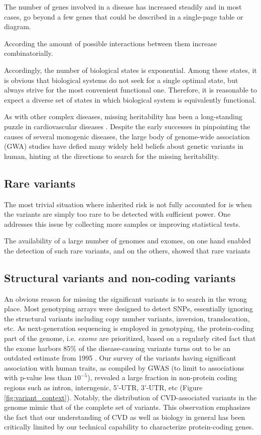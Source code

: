 \documentclass[letter]{bioinfo}
\begin{document}
The number of genes involved in a disease has increased steadily and in most cases, go beyond a few genes that could be described in a single-page table or diagram.

According the amount of possible interactions between them increase combinatorially.

Accordingly, the number of biological states is exponential. Among these states, it is obvious that biological systems do not seek for a single optimal state, but always strive for the most convenient functional one. Therefore, it is reasonable to expect a diverse set of states in which biological system is equivalently functional.

As with other complex diseases, missing heritability has been a long-standing puzzle in cardiovascular diseases \citep{Manolio:2009:Finding}. Despite the early successes in pinpointing the causes of several monogenic diseases, the large body of genome-wide association (GWA) studies have defied many widely held beliefs about genetic variants in human, hinting at the directions to search for the missing heritability.

\subsection{Rare variants}

The most trivial situation where inherited risk is not fully accounted for is when the variants are simply too rare to be detected with sufficient power. One addresses this issue by collecting more samples or improving statistical tests.

The availability of a large number of genomes and exomes, on one hand enabled the detection of such rare variants, and on the others,  showed that rare variants 

\subsection{Structural variants and non-coding variants}

An obvious reason for missing the significant variants is to search in the wrong place. Most genotyping arrays were designed to detect SNPs, essentially ignoring the structural variants including copy number variants, inversion, translocation, etc. As next-generation sequencing is employed in genotyping, the protein-coding part of the genome, i.e. \textit{exome} are prioritized, based on a regularly cited fact that the exome harbors 85\% of the disease-causing variants turns out to be an outdated estimate from 1995 \citep{Antonarakis:2001:nature}. Our survey of the variants having significant association with human traits, as compiled by GWAS (to limit to associations with p-value less than $10^{-5}$), revealed a large fraction in non-protein coding regions such as intron, interngenic, 5'-UTR, 3'-UTR, etc (Figure \ref{fig:variant_context}). Notably, the distribution of CVD-associated variants in the genome mimic that of the complete set of variants. This observation emphasizes the fact that our understanding of CVD as well as biology in general has been critically limited by our technical capability to characterize protein-coding genes. 
\end{document}
